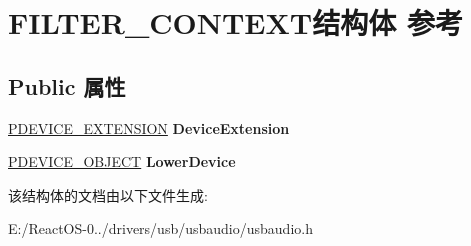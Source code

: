\hypertarget{struct_f_i_l_t_e_r___c_o_n_t_e_x_t}{}\section{F\+I\+L\+T\+E\+R\+\_\+\+C\+O\+N\+T\+E\+X\+T结构体 参考}
\label{struct_f_i_l_t_e_r___c_o_n_t_e_x_t}
\subsection*{Public 属性}
\begin{DoxyCompactItemize}
\item 
\mbox{\label{struct_f_i_l_t_e_r___c_o_n_t_e_x_t_ae5e96dc0db0b8dc4a1f0093147bdab8b}} 
\hyperlink{struct___b_e_e_p___d_e_v_i_c_e___e_x_t_e_n_s_i_o_n}{P\+D\+E\+V\+I\+C\+E\+\_\+\+E\+X\+T\+E\+N\+S\+I\+ON} {\bfseries Device\+Extension}
\item 
\mbox{\label{struct_f_i_l_t_e_r___c_o_n_t_e_x_t_acb7e991d09d435d119db330cc9740b2d}} 
\hyperlink{struct___d_e_v_i_c_e___o_b_j_e_c_t}{P\+D\+E\+V\+I\+C\+E\+\_\+\+O\+B\+J\+E\+CT} {\bfseries Lower\+Device}
\end{DoxyCompactItemize}


该结构体的文档由以下文件生成\+:\begin{DoxyCompactItemize}
\item 
E\+:/\+React\+O\+S-\/0../drivers/usb/usbaudio/usbaudio.\+h\end{DoxyCompactItemize}
